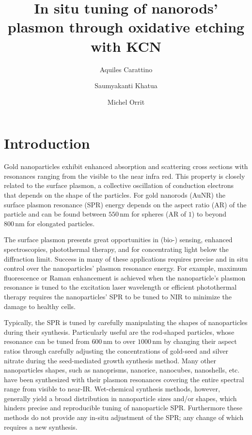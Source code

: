 \documentclass[a4paper,oneside,onecolumn]{article}
\title{In situ tuning of nanorods' plasmon through oxidative etching with KCN}
\author[1]{Aquiles Carattino}
\author[2]{Saumyakanti Khatua}
\author[1]{Michel Orrit}
\affil[1]{Leiden Institute of Physics, Leiden, The Netherlands}
\affil[2]{Indian Institute of Technology- Gandhinagar, Ahmedabad,  India}
\newcommand{\nm}{\ensuremath{\,\textrm{nm}}}
\begin{document}
\maketitle
{}

\section{Introduction}

Gold nanoparticles exhibit enhanced absorption and scattering cross sections
with resonances ranging from the visible to the near infra red. This property is
closely related to the surface plasmon, a collective oscillation of conduction
electrons that depends on the shape of the particles. For gold nanorods (AuNR)
the surface plasmon resonance (SPR) energy depends on the aspect ratio (AR) of
the particle and can be found between $550\nm$ for spheres (AR of $1$) to beyond
$800\nm$ for elongated particles.

The surface plasmon presents great opportunities in (bio-)
sensing\cite{Zijlstra2012}, enhanced spectroscopies\cite{Sivapalan2013},
photothermal therapy\cite{Zhao2014}, and for concentrating light below the
diffraction limit\cite{Zijlstra2011}. Success in many of these applications
requires precise and in situ control over the nanoparticles' plasmon resonance
energy. For example, maximum fluorescence\cite{Khatua2014} or Raman
enhancement\cite{McFarland2005} is achieved when the nanoparticle's plasmon
resonance is tuned to the excitation laser wavelength or efficient photothermal
therapy requires the nanoparticles' SPR to be tuned to NIR to minimize the
damage to healthy cells\cite{Alkilany2012}.

Typically, the SPR is tuned by carefully manipulating the shapes of
nanoparticles during their synthesis. Particularly useful are the rod-shaped
particles, whose resonance can be tuned from $600\nm$ to over $1000\nm$ by
changing their aspect ratios through carefully adjusting the concentrations of
gold-seed and silver nitrate during the seed-mediated growth synthesis
method\cite{Vigderman2012}. Many other nanoparticles shapes, such as nanoprisms,
nanorice, nanocubes, nanoshells, etc. have been synthesized with their plasmon
resonances covering the entire spectral range from visible to
near-IR\cite{West2003}.
Wet-chemical synthesis methods, however, generally yield a broad distribution in
nanoparticle sizes and/or shapes, which hinders precise and reproducible tuning
of nanoparticle SPR. Furthermore these methods do not provide any in-situ
adjustment of the SPR; any change of which requires a new synthesis.
\end{document}
